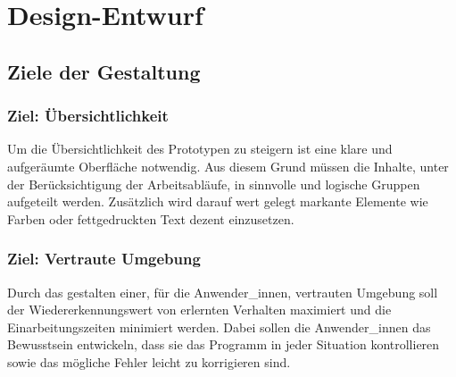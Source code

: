 \documentclass[Bachelorarbeit.tex]{subfiles}
\begin{document}
\section{Design-Entwurf}
\label{chap:entwicklung:sec:design_entwurf}

\subsection{Ziele der Gestaltung}
\label{chap:entwicklung:sec:design_entwurf:subs:ziele_der_gestaltung}

\subsubsection*{Ziel: Übersichtlichkeit}
\label{subsub:ziel_uebersichtlichkeit}
Um die Übersichtlichkeit des Prototypen zu steigern ist eine klare und aufgeräumte Oberfläche notwendig. 
Aus diesem Grund müssen die Inhalte, unter der Berücksichtigung der Arbeitsabläufe, in sinnvolle und logische Gruppen aufgeteilt werden. 
Zusätzlich wird darauf wert gelegt markante Elemente wie Farben oder fettgedruckten Text dezent einzusetzen. 


\subsubsection*{Ziel: Vertraute Umgebung}
\label{subsub:ziel_vertraute_umgebung}
Durch das gestalten einer, für die Anwender\_innen, vertrauten Umgebung soll der Wiedererkennungswert von erlernten Verhalten maximiert und die Einarbeitungszeiten minimiert werden.
Dabei sollen die Anwender\_innen das Bewusstsein entwickeln, dass sie das Programm in jeder Situation kontrollieren sowie das mögliche Fehler leicht zu korrigieren sind.
\end{document}
